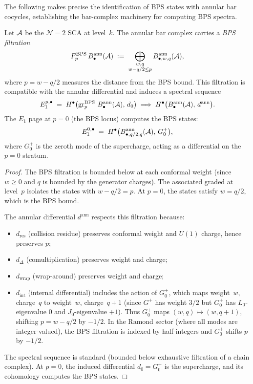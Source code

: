 The following makes precise the identification of BPS states
with annular bar cocycles, establishing the bar-complex
machinery for computing BPS spectra.

\begin{theorem}%
\label{thm:bps-filtration}%
%
%
Let $\mathcal{A}$ be the $\mathcal N=2$ SCA at level~$k$.
The annular bar complex carries a \emph{BPS filtration}
\[
F^{\mathrm{BPS}}_p\,B^{\mathrm{ann}}_\bullet(\mathcal{A})
\;:=\;
\bigoplus_{\substack{w,q \\ w-q/2\le p}}
B^{\mathrm{ann}}_{\bullet,w,q}(\mathcal{A}),
\]
where $p = w - q/2$ measures the distance from the BPS
bound. This filtration is compatible with the
annular differential and induces a spectral sequence
\begin{equation}\label{eq:bps-spectral-sequence}
E_1^{p,\bullet}
\;=\;
H^\bullet\bigl(
\operatorname{gr}_p^{\mathrm{BPS}}\,
B^{\mathrm{ann}}_\bullet(\mathcal{A}),\,
d_0
\bigr)
\;\Longrightarrow\;
H^\bullet\bigl(
B^{\mathrm{ann}}_\bullet(\mathcal{A}),\,
d^{\mathrm{ann}}
\bigr).
\end{equation}
The $E_1$ page at $p=0$ (the BPS locus) computes the
BPS states:
\[
E_1^{0,\bullet}
\;=\;
H^\bullet\bigl(
B^{\mathrm{ann}}_{\bullet,q/2,q}(\mathcal{A}),\,
G^+_0
\bigr),
\]
where $G^+_0$ is the zeroth mode of the supercharge,
acting as a differential on the $p=0$ stratum.
\end{theorem}

\begin{proof}
The BPS filtration is bounded below at each conformal
weight (since $w\ge 0$ and $q$ is bounded by the generator
charges). The associated graded at level~$p$ isolates
the states with $w - q/2 = p$. At $p=0$, the states
satisfy $w = q/2$, which is the BPS bound.

The annular differential $d^{\mathrm{ann}}$ respects
this filtration because:
\begin{itemize}
\item $d_{\mathrm{res}}$ (collision residue) preserves
 conformal weight and $U(1)$ charge, hence preserves $p$;
\item $d_\Delta$ (comultiplication) preserves weight and
 charge;
\item $d_{\mathrm{wrap}}$ (wrap-around) preserves weight
 and charge;
\item $d_{\mathrm{int}}$ (internal differential) includes
 the action of $G^+_0$, which maps weight~$w$,
 charge~$q$ to weight~$w$, charge~$q+1$ (since $G^+$
 has weight $3/2$ but $G^+_0$ has $L_0$-eigenvalue $0$
 and $J_0$-eigenvalue $+1$). Thus $G^+_0$ maps
 $(w,q)\mapsto (w,q+1)$, shifting $p = w-q/2$ by
 $-1/2$. In the Ramond sector (where all modes are
 integer-valued), the BPS filtration is indexed by
 half-integers and $G^+_0$ shifts $p$ by $-1/2$.
\end{itemize}

The spectral sequence is standard (bounded below
exhaustive filtration of a chain complex). At $p=0$,
the induced differential $d_0 = G^+_0$ is the
supercharge, and its cohomology computes the BPS states.
\end{proof}

